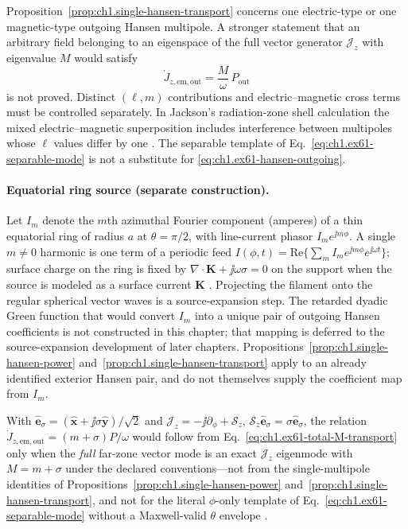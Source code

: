 \begin{remark}
\label{rem:ch1.am-power-target}
Proposition~\ref{prop:ch1.single-hansen-transport} concerns one electric-type or one magnetic-type outgoing Hansen multipole. A stronger statement that an arbitrary field belonging to an eigenspace of the full vector generator $\mathcal{J}_z$ with eigenvalue $M$ would satisfy
\begin{equation}
\label{eq:ch1.ex61-total-M-transport}
\dot J_{z,\mathrm{em,out}}=\frac{M}{\omega}\,P_{\mathrm{out}}
\end{equation}
is not proved. Distinct $(\ell,m)$ contributions and electric--magnetic cross terms must be controlled separately. In Jackson's radiation-zone shell calculation the mixed electric--magnetic superposition includes interference between multipoles whose $\ell$ values differ by one \cite[Eq.~(9.145)]{jackson1999}. The separable template of Eq.~\eqref{eq:ch1.ex61-separable-mode} is not a substitute for \eqref{eq:ch1.ex61-hansen-outgoing}.
\end{remark}

\paragraph{Equatorial ring source (separate construction).}
Let $I_m$ denote the $m$th azimuthal Fourier component (amperes) of a thin equatorial ring of radius $a$ at $\theta=\pi/2$, with line-current phasor $I_m e^{\jj m\phi}$. A single $m\neq0$ harmonic is one term of a periodic feed $I(\phi,t)=\mathrm{Re}\{\sum_m I_m e^{\jj m\phi}e^{\jj\omega t}\}$; surface charge on the ring is fixed by $\nabla\cdot\mathbf K+\jj\omega\sigma=0$ on the support when the source is modeled as a surface current $\mathbf K$ \cite{stratton1941}. Projecting the filament onto the regular spherical vector waves is a source-expansion step. The retarded dyadic Green function that would convert $I_m$ into a unique pair of outgoing Hansen coefficients is not constructed in this chapter; that mapping is deferred to the source-expansion development of later chapters. Propositions~\ref{prop:ch1.single-hansen-power} and~\ref{prop:ch1.single-hansen-transport} apply to an already identified exterior Hansen pair, and do not themselves supply the coefficient map from $I_m$.
\begin{corollary}[Fixed-axis spin plus azimuth only when $M=m+\sigma_z$ is proved]
\label{cor:ch1.m-plus-sigma}
With $\hat{\mathbf{e}}_\sigma=(\hat{\mathbf{x}}+\jj\sigma\hat{\mathbf{y}})/\sqrt{2}$ and $\mathcal{J}_z=-\jj\partial_\phi+\mathcal{S}_z$, $\mathcal{S}_z\hat{\mathbf{e}}_\sigma=\sigma\hat{\mathbf{e}}_\sigma$, the relation $\dot J_{z,\mathrm{em,out}}=(m+\sigma)P/\omega$ would follow from Eq.~\eqref{eq:ch1.ex61-total-M-transport} only when the \emph{full} far-zone vector mode is an exact $\mathcal{J}_z$ eigenmode with $M=m+\sigma$ under the declared conventions---not from the single-multipole identities of Propositions~\ref{prop:ch1.single-hansen-power} and~\ref{prop:ch1.single-hansen-transport}, and not for the literal $\phi$-only template of Eq.~\eqref{eq:ch1.ex61-separable-mode} without a Maxwell-valid $\theta$ envelope \cite{allen1992,cerjan2011,monteiro2009}.
\end{corollary}

